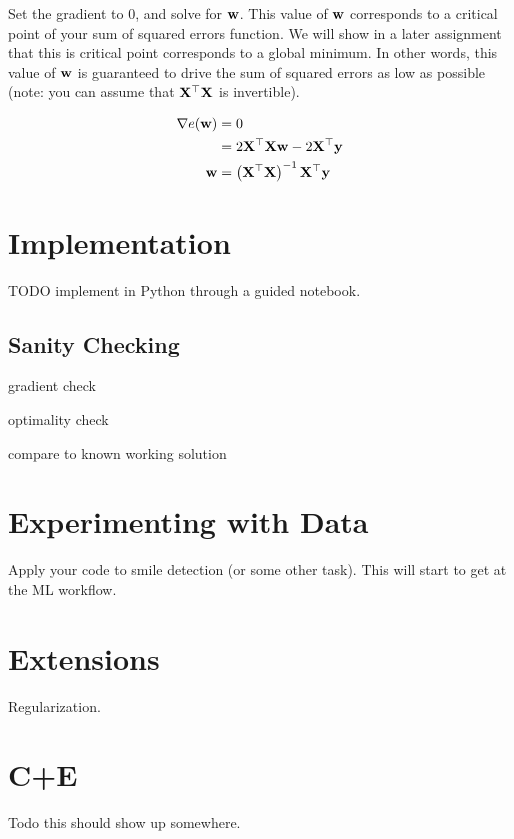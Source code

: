 \documentclass[assignment02_Solutions]{subfiles}
\begin{document}
\begin{exercise}[60 minutes]
\item Set the gradient to 0, and solve for $\mathbf{w}$.  This value of $\mathbf{w}$ corresponds to a critical point of your sum of squared errors function.  We will show in a later assignment that this is critical point corresponds to a global minimum.  In other words, this value of $\mathbf{w}$ is guaranteed to drive the sum of squared errors as low as possible (note: you can assume that $\mathbf{X}^\top \mathbf{X}$ is invertible).

\begin{boxedsolution}
\begin{align}
\nabla e(\mathbf{w})  &= 0 \\
&= 2 \mathbf{X}^\top \mathbf{X} \mathbf{w} - 2 \mathbf{X}^\top \mathbf{y}\\
\mathbf{w} &= \left ( \mathbf{X}^\top \mathbf{X} \right )^{-1} \mathbf{X}^\top \mathbf{y}
\end{align}
\end{boxedsolution}

\ees
\end{exercise}
%

\section{Implementation}

TODO implement in Python through a guided notebook.

\subsection{Sanity Checking}
\be
\item gradient check
\item optimality check
\item compare to known working solution
\ee

\section{Experimenting with Data}

Apply your code to smile detection (or some other task).  This will start to get at the ML workflow.


\section{Extensions}
Regularization.

\section{C+E}
Todo this should show up somewhere.
\end{document}

